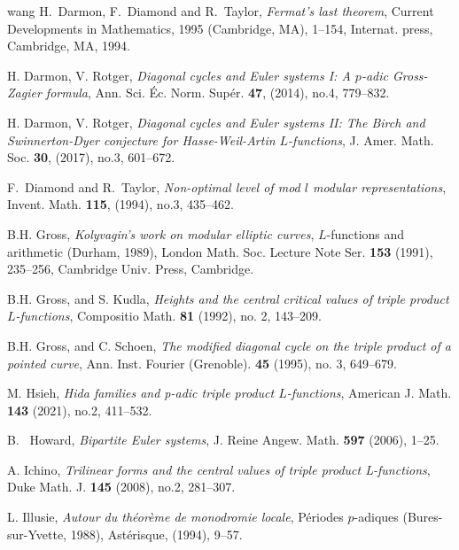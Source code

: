 \documentclass[10pt]{amsart}
\numberwithin{equation}{section}
\theoremstyle{plain}
\numberwithin{equation}{section}
\theoremstyle{definition}
\theoremstyle{remark}
\begin{document}
\begin{thebibliography}{wang}
H.~Darmon, F.~Diamond and R.~Taylor, {\em Fermat's last theorem}, Current Developments in Mathematics, 1995 (Cambridge, MA), 1--154, Internat. press, Cambridge, MA, 1994.          

H. Darmon, V. Rotger,
 {\em Diagonal cycles and {E}uler systems {I}: {A} {$p$}-adic
              {G}ross-{Z}agier formula}, Ann. Sci. \'{E}c. Norm. Sup\'{e}r. {\bf 47}, (2014), no.4, 779--832.   
              
H. Darmon, V. Rotger,
 {\em Diagonal cycles and {E}uler systems {II}: {T}he {B}irch and
              {S}winnerton-{D}yer conjecture for {H}asse-{W}eil-{A}rtin
              {$L$}-functions}, J. Amer. Math. Soc. {\bf 30}, (2017), no.3, 601--672.
              
F.~Diamond and R.~Taylor, {\em Non-optimal level of mod $l$ modular representations}, Invent. Math. {\bf 115}, (1994), no.3, 435--462.   

 B.H. Gross, 
{\em Kolyvagin's work on modular elliptic curves}, {$L$}-functions and arithmetic ({D}urham, 1989), London Math. Soc. Lecture Note Ser.
{\bf 153} (1991), 235--256, Cambridge Univ. Press, Cambridge.

 B.H. Gross,  and S. Kudla, 
{\em Heights and the central critical values of triple product
              {$L$}-functions}, Compositio Math. {\bf 81} (1992), no. 2, 143--209. 

 B.H. Gross,  and C. Schoen, 
{\em The modified diagonal cycle on the triple product of a pointed curve}, Ann. Inst. Fourier (Grenoble). {\bf 45} (1995), no. 3, 649--679.
              
M. Hsieh, 
{\em Hida families and p-adic triple product $L$-functions},  American J. Math.  {\bf 143} (2021), no.2, 411--532. 

 B.~ Howard, 
{\em Bipartite Euler systems}, J. Reine Angew. Math. {\bf 597} (2006), 1--25.              
                       
A. Ichino, {\em Trilinear forms and the central values of triple product L-functions}, 
Duke Math. J. {\bf 145} (2008), no.2, 281--307. 
              
L. Illusie, {\em Autour du th\'{e}or\`eme de monodromie locale},  P\'{e}riodes $p$-adiques (Bures-sur-Yvette, 1988), Ast\'{e}risque, (1994), 9--57. 


\end{thebibliography}
\end{document}
